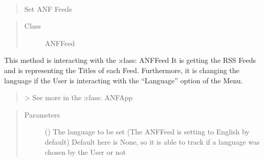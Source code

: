 \documentclass[letterpaper,10pt,english]{sphinxmanual}
\begin{document}
\begin{fulllineitems}
\begin{fulllineitems}
\label{\detokenize{anfrss.gui:anfrss.gui.guiapp.TitleWidget.newsFeed}}~\begin{quote}

Set ANF Feeds
\end{quote}
\begin{quote}\begin{description}
\item[{Class}] \leavevmode
ANFFeed

\end{description}\end{quote}

This method is interacting
with the :class: ANFFeed
It is getting the RSS Feeds
and is representing the Titles
of each Feed.
Furthermore, it is changing
the language if the User is
interacting with the “Language”
option of the Menu.
\begin{quote}

\sphinxhyphen{}\textgreater{} See more in the
:class: ANFApp
\end{quote}
\begin{quote}\begin{description}
\item[{Parameters}] \leavevmode
{} (\sphinxstyleliteralemphasis{\sphinxupquote{, }}) \textendash{} The language to be set
(The ANFFeed is setting
to English by default)
Default here is None, so
it is able to track if
a language was chosen by
the User or not

\end{description}\end{quote}

\end{fulllineitems}


\begin{fulllineitems}
\label{\detokenize{anfrss.gui:anfrss.gui.guiapp.TitleWidget.onClicked}}~\begin{quote}


\end{quote}
\end{fulllineitems}
\end{fulllineitems}
\end{document}
